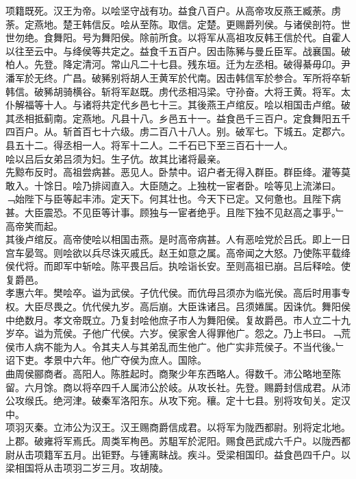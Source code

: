 \documentclass{zhvt-classic}
\begin{document}
\hspace*{2em}项籍既死。汉王为帝。以哙坚守战有功。益食八百户。从高帝攻反燕王臧荼。虏荼。定燕地。楚王韩信反。哙从至陈。取信。定楚。更赐爵列侯。与诸侯剖符。世世勿绝。食舞阳。号为舞阳侯。除前所食。以将军从高祖攻反韩王信於代。自霍人以往至云中。与绛侯等共定之。益食千五百户。因击陈豨与曼丘臣军。战襄国。破柏人。先登。降定清河。常山凡二十七县。残东垣。迁为左丞相。破得綦毋卬。尹潘军於无终。广昌。破豨别将胡人王黄军於代南。因击韩信军於参合。军所将卒斩韩信。破豨胡骑横谷。斩将军赵既。虏代丞相冯梁。守孙奋。大将王黄。将军。太仆解福等十人。与诸将共定代乡邑七十三。其後燕王卢绾反。哙以相国击卢绾。破其丞相抵蓟南。定燕地。凡县十八。乡邑五十一。益食邑千三百户。定食舞阳五千四百户。从。斩首百七十六级。虏二百八十八人。别。破军七。下城五。定郡六。县五十二。得丞相一人。将军十二人。二千石已下至三百石十一人。\\
\hspace*{2em}哙以吕后女弟吕须为妇。生子伉。故其比诸将最亲。\\
\hspace*{2em}先黥布反时。高祖尝病甚。恶见人。卧禁中。诏户者无得入群臣。群臣绛。灌等莫敢入。十馀日。哙乃排闼直入。大臣随之。上独枕一宦者卧。哙等见上流涕曰。﹁始陛下与臣等起丰沛。定天下。何其壮也。今天下已定。又何惫也。且陛下病甚。大臣震恐。不见臣等计事。顾独与一宦者绝乎。且陛下独不见赵高之事乎。﹂高帝笑而起。\\
\hspace*{2em}其後卢绾反。高帝使哙以相国击燕。是时高帝病甚。人有恶哙党於吕氏。即上一日宫车晏驾。则哙欲以兵尽诛灭戚氏。赵王如意之属。高帝闻之大怒。乃使陈平载绛侯代将。而即军中斩哙。陈平畏吕后。执哙诣长安。至则高祖已崩。吕后释哙。使复爵邑。\\
\hspace*{2em}孝惠六年。樊哙卒。谥为武侯。子伉代侯。而伉母吕须亦为临光侯。高后时用事专权。大臣尽畏之。伉代侯九岁。高后崩。大臣诛诸吕。吕须婘属。因诛伉。舞阳侯中绝数月。孝文帝既立。乃复封哙他庶子市人为舞阳侯。复故爵邑。市人立二十九岁卒。谥为荒侯。子他广代侯。六岁。侯家舍人得罪他广。怨之。乃上书曰。﹁荒侯市人病不能为人。令其夫人与其弟乱而生他广。他广实非荒侯子。不当代後。﹂诏下吏。孝景中六年。他广夺侯为庶人。国除。\\
\hspace*{2em}曲周侯郦商者。高阳人。陈胜起时。商聚少年东西略人。得数千。沛公略地至陈留。六月馀。商以将卒四千人属沛公於岐。从攻长社。先登。赐爵封信成君。从沛公攻缑氏。绝河津。破秦军洛阳东。从攻下宛。穰。定十七县。别将攻旬关。定汉中。\\
\hspace*{2em}项羽灭秦。立沛公为汉王。汉王赐商爵信成君。以将军为陇西都尉。别将定北地。上郡。破雍将军焉氏。周类军栒邑。苏駔军於泥阳。赐食邑武成六千户。以陇西都尉从击项籍军五月。出钜野。与锺离眛战。疾斗。受梁相国印。益食邑四千户。以梁相国将从击项羽二岁三月。攻胡陵。\\
\end{document}
